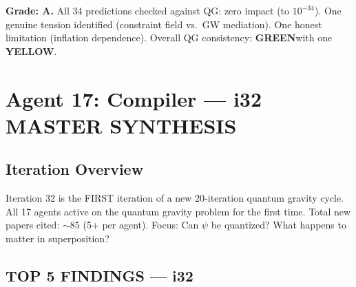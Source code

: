 \documentclass[11pt,a4paper]{article}
\newcommand{\GREEN}{\textcolor{dfdgreen}{\textbf{GREEN}}}
\newcommand{\YELLOW}{\textcolor{dfdyellow}{\textbf{YELLOW}}}
\begin{document}
\textbf{Grade: A.} All 34 predictions checked against QG: zero impact (to $10^{-34}$). One genuine tension identified (constraint field vs.\ GW mediation). One honest limitation (inflation dependence). Overall QG consistency: \GREEN with one \YELLOW.


\newpage
\section{Agent 17: Compiler --- i32 MASTER SYNTHESIS}
\label{sec:agent17}

\subsection{Iteration Overview}

Iteration 32 is the FIRST iteration of a new 20-iteration quantum gravity cycle. All 17 agents active on the quantum gravity problem for the first time. Total new papers cited: $\sim 85$ (5+ per agent). Focus: Can $\psi$ be quantized? What happens to matter in superposition?

\subsection{TOP 5 FINDINGS --- i32}
\label{sec:top5}
\end{document}
